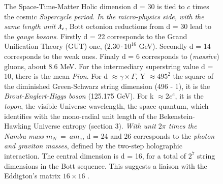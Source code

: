 \documentclass[a4paper,9pt]{article}
\begin{document}
\begin{appendix}
\begin{figure}
{The Space-Time-Matter Holic dimension d = 30 is tied to $c$ times the cosmic \textit{Supercycle period}. 
\textit{In the micro-physics side, with the same length unit $\lambdabar_e$}, Bott octonion reductions from d = 30 lead  to the \textit{gauge bosons}. Firstly d = 22 corresponds to the Grand Unification Theory (GUT) one, ($ 2.30\cdot10^{16}$ GeV). Secondly d = 14 corresponds to the weak ones. Finaly d = 6 corresponds to (\textit{massive}) gluons, about 8.6 MeV.
For the intermediary superstring value d = 10, there is the mean \textit{Pion}. For d $\approx \gamma \times \Gamma$, Y $\approx 495^2$ the square of the diminished Green-Schwarz string dimension (496 - 1), it is the \textit{Brout-Englert-Higgs boson} (125.175 GeV). For k $\approx 2e^e$, it is the \textit{topon}, the visible Universe wavelength, the space quantum, which identifies with the mono-radial unit length of the Bekenstein-Hawking Universe entropy (section 3).
   \textit{With unit $2\pi$ times the Nambu mass $m_N~=~am_e$}, d = 24 and 26 corresponds to the \textit{photon and graviton masses}, defined by the two-step holographic interaction\cite{Sanchez1}.}
The central dimension is d = 16, for a total of $2^7$ string dimensions in the Bott sequence.
This suggests a liaison with the Eddigton's matrix $16 \times 16$ \cite{Eddington}. 
    

\end{figure}
\end{appendix}
\end{document}
